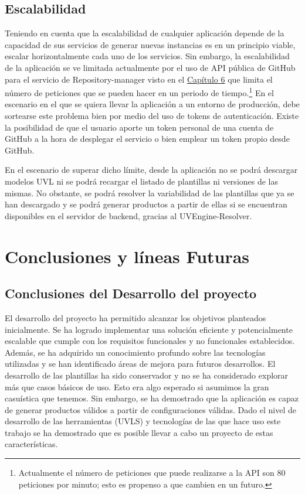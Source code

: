 \documentclass[12pt, a4paper, twoside]{article}
\begin{document}
\subsection{Escalabilidad}
Teniendo en cuenta que la escalabilidad de cualquier aplicación depende de la capacidad de sus servicios de generar nuevas instancias es en un principio viable,
escalar horizontalmente cada uno de los servicios. Sin embargo, la escalabilidad de la aplicación se ve limitada actualmente por el uso de API pública de GitHub \cite{github_rest_api} para el servicio de Repository-manager visto en el \hyperref[sec:Desarrollo de los servicios de backend]{Capítulo 6} que limita el número de peticiones que se pueden hacer en un periodo de tiempo.\footnote{Actualmente el número de peticiones que puede realizarse a la API son 80 peticiones por minuto; esto es propenso a que cambien en un futuro.}
En el escenario en el que se quiera llevar la aplicación a un entorno de producción, debe sortearse este problema bien por medio del uso de tokens de autenticación.
Existe la posibilidad de que el usuario aporte un token personal de una cuenta de GitHub a la hora de desplegar el servicio o bien emplear un token propio desde GitHub.

En el escenario de superar dicho límite, desde la aplicación no se podrá descargar modelos UVL ni se podrá recargar el listado de plantillas ni versiones de las mismas.
No obstante, se podrá resolver la variabilidad de las plantillas que ya se han descargado y se podrá generar productos a partir de ellas si se encuentran disponibles en el servidor de backend, gracias al UVEngine-Resolver. 










\section{Conclusiones y líneas Futuras}
\label{sec:Conclusiones}


\subsection{Conclusiones del Desarrollo del proyecto}
El desarrollo del proyecto ha permitido alcanzar los objetivos planteados inicialmente. Se ha logrado implementar una solución eficiente y potencialmente escalable que cumple con los requisitos funcionales y no funcionales establecidos. Además, se ha adquirido un conocimiento profundo sobre las tecnologías utilizadas y se han identificado áreas de mejora para futuros desarrollos.
El desarrollo de las plantillas ha sido conservador y no se ha considerado explorar más que casos básicos de uso. Esto era algo esperado si asumimos la gran casuística que tenemos. Sin embargo, se ha demostrado que la aplicación es capaz de generar productos válidos a partir de configuraciones válidas. Dado el nivel de desarrollo de las herramientas (UVLS) y tecnologías de las que hace uso este trabajo se ha demostrado que es posible llevar a cabo un proyecto de estas características.
\end{document}
